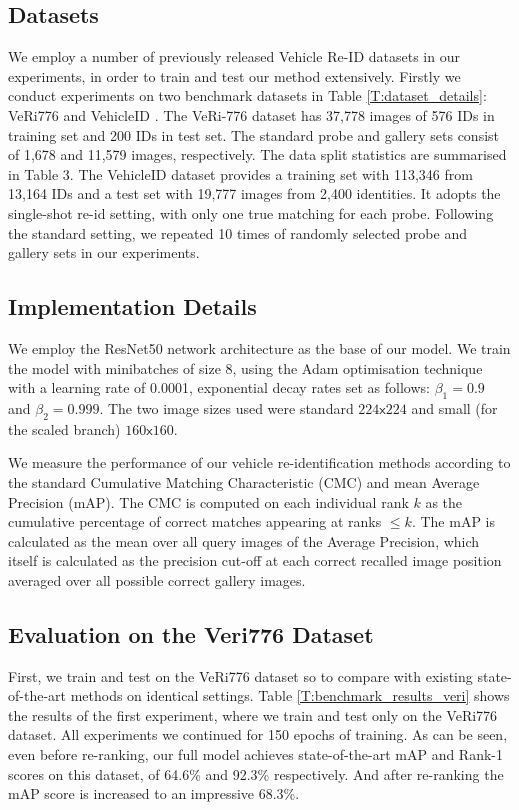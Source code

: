 \documentclass[10pt,twocolumn,letterpaper]{article}
\def\x{{\mathsf x}}
\begin{document}
\subsection{Datasets}
We employ a number of previously released Vehicle Re-ID datasets in our experiments, in order to train and test our method extensively. Firstly we conduct experiments on two benchmark datasets in Table \ref{T:dataset_details}:
VeRi776 \cite{liu2016veri} and VehicleID \cite{liu2016vehicleid}.
%
The VeRi-776 dataset \cite{liu2016veri} has 37,778 images of 576 IDs in training set and 200
IDs in test set. The standard probe and gallery sets consist of 1,678 and 11,579
images, respectively. The data split statistics are summarised in Table 3.
%
The VehicleID \cite{liu2016vehicleid} dataset provides a training set with 113,346 from 13,164 IDs and a test set
with 19,777 images from 2,400 identities. It adopts the single-shot re-id setting,
with only one true matching for each probe. Following the standard setting, we
repeated 10 times of randomly selected probe and gallery sets in our experiments.


\subsection{Implementation Details}
We employ the ResNet50 \cite{he2016deep} network
architecture as the base of our model. We train the model with
minibatches of size 8, using the Adam optimisation technique with a
learning rate of 0.0001, exponential decay rates set as follows:
$\beta_1=0.9$ and $\beta_2=0.999$. The two image sizes used were
standard $224\x224$ and small (for the scaled branch) $160\x160$.

We measure the performance of our vehicle re-identification methods according to the standard Cumulative Matching Characteristic (CMC) and mean Average Precision (mAP). The CMC is computed on each individual rank $k$ as the cumulative percentage of correct matches appearing
at ranks $\leq k$. The mAP is calculated as the mean over all query images of the Average Precision, which itself is calculated as the precision cut-off at each correct recalled image position averaged over all possible correct gallery images.

\subsection{Evaluation on the Veri776 Dataset}
First, we train and test on the VeRi776 dataset so to compare with
existing state-of-the-art methods on identical settings.
Table \ref{T:benchmark_results_veri} shows the results of the first
experiment, where we train and test only on the VeRi776 dataset. All
experiments we continued for 150 epochs of training. As can be seen,
even before re-ranking, our full model achieves state-of-the-art mAP
and Rank-1 scores on this dataset, of 64.6\% and 92.3\%
respectively. And after re-ranking the mAP score is increased to an
impressive 68.3\%.
\end{document}
